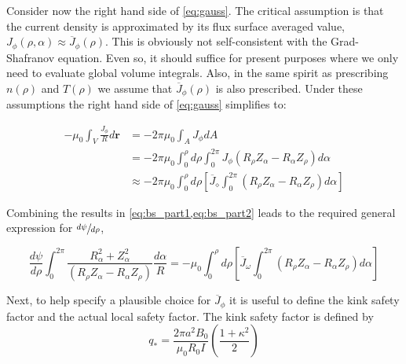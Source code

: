 Consider now the right hand side of \cref{eq:gauss}. The critical assumption is that the current density is approximated by its flux surface averaged value, $J _ { \phi } ( \rho , \alpha ) \approx \overline { J } _ { \phi } ( \rho )$. This is obviously not self-consistent with the Grad-Shafranov equation. Even so, it should suffice for present purposes where we only need to evaluate global volume integrals. Also, in the same spirit as prescribing $n(\rho)$ and $T(\rho)$ we assume that $\overline { J } _ { \phi } ( \rho )$ is also prescribed. Under these assumptions the right hand side of \cref{eq:gauss} simplifies to:

\begin{equation}
	\label{eq:bs_part2}
	\begin{aligned} - \mu _ { 0 } \int _ { V } \frac { J _ { \phi } } { R } d \mathbf { r } & = - 2 \pi \mu _ { 0 } \int _ { A } J _ { \phi } d A \\ & = - 2 \pi \mu _ { 0 } \int _ { 0 } ^ { \rho } d \rho \int _ { 0 } ^ { 2 \pi } J _ { \phi } \left( R _ { \rho } Z _ { \alpha } - R _ { \alpha } Z _ { \rho } \right) d \alpha \\ & \approx - 2 \pi \mu _ { 0 } \int _ { 0 } ^ { \rho } d \rho \left[ \overline { J } _ { \diamond } \int _ { 0 } ^ { 2 \pi } \left( R _ { \rho } Z _ { \alpha } - R _ { \alpha } Z _ { \rho } \right) d \alpha \right] \end{aligned}
\end{equation}

Combining the results in \cref{eq:bs_part1,eq:bs_part2} leads to the required general expression for $\sfrac{ d\psi }{ d \rho }$,

\begin{equation}
\label{eq:bs_parta}
\frac { d \psi } { d \rho } \int _ { 0 } ^ { 2 \pi } \frac { R _ { \alpha } ^ { 2 } + Z _ { \alpha } ^ { 2 } } { \left( R _ { \rho } Z _ { \alpha } - R _ { \alpha } Z _ { \rho } \right) } \frac { d \alpha } { R } = - \mu _ { 0 } \int _ { 0 } ^ { \rho } d \rho \left[ \overline { J } _ { \omega } \int _ { 0 } ^ { 2 \pi } \left( R _ { \rho } Z _ { \alpha } - R _ { \alpha } Z _ { \rho } \right) d \alpha \right]
\end{equation}

Next, to help specify a plausible choice for $\overline { J } _ { \phi } $ it is useful to define the kink safety factor and the actual local safety factor. The kink safety factor is defined by
\begin{equation}
q _ { * } = \frac { 2 \pi a ^ { 2 } B _ { 0 } } { \mu _ { 0 } R _ { 0 } I } \left( \frac { 1 + \kappa ^ { 2 } } { 2 } \right)
\end{equation}

